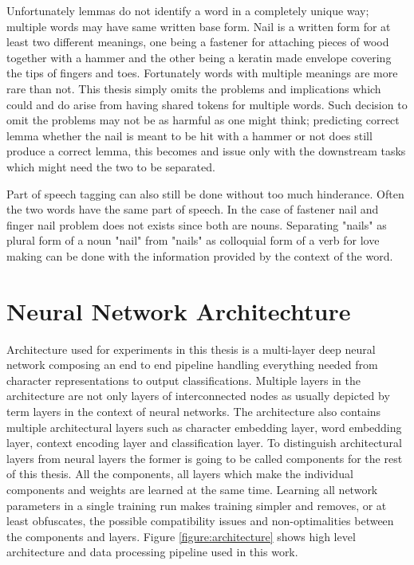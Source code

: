 \documentclass[12pt,a4paper,english
]{tutthesis}
\begin{document}
Unfortunately lemmas do not identify a word in a completely unique way; multiple words may have same written base form. Nail is a written form for at least two different meanings, one being a fastener for attaching pieces of wood together with a hammer and the other being a keratin made envelope covering the tips of fingers and toes. Fortunately words with multiple meanings are more rare than not. This thesis simply omits the problems and implications which could and do arise from having shared tokens for multiple words. Such decision to omit the problems may not be as harmful as one might think; predicting correct lemma whether the nail is meant to be hit with a hammer or not does still produce a correct lemma, this becomes and issue only with the downstream tasks which might need the two to be separated.

Part of speech tagging can also still be done without too much hinderance. Often the two words have the same part of speech. In the case of fastener nail and finger nail problem does not exists since both are nouns. Separating "nails" as plural form of a noun "nail" from "nails" as colloquial form of a verb for love making can be done with the information provided by the context of the word.


\section{Neural Network Architechture}
\label{se:architecture}
Architecture used for experiments in this thesis is a multi-layer deep neural network composing an end to end pipeline handling everything needed from character representations to output classifications. Multiple layers in the architecture are not only layers of interconnected nodes as usually depicted by term layers in the context of neural networks. The architecture also contains multiple architectural layers such as character embedding layer, word embedding layer, context encoding layer and classification layer. To distinguish architectural layers from neural layers the former is going to be called components for the rest of this thesis. All the components, all layers which make the individual components and weights are learned at the same time. Learning all network parameters in a single training run makes training simpler and removes, or at least obfuscates, the possible compatibility issues and non-optimalities between the components and layers. Figure \ref{figure:architecture} shows high level architecture and data processing pipeline used in this work.
\end{document}
